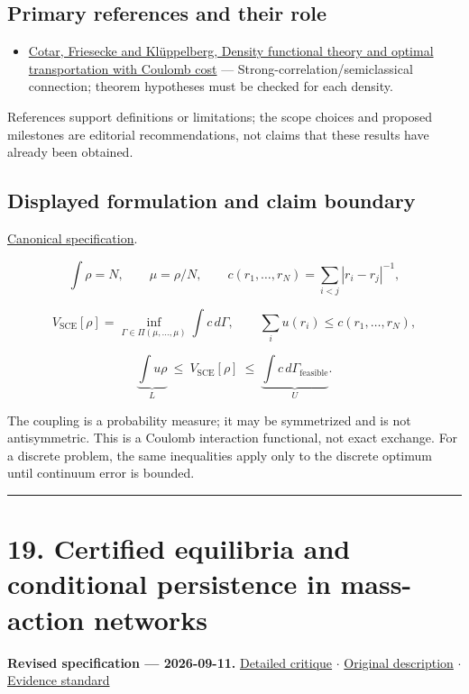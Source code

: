 \documentclass[
  11pt,
]{article}
\providecommand{\tightlist}{%
  \setlength{\itemsep}{0pt}\setlength{\parskip}{0pt}}
\begin{document}
\subsection{Primary references and their role}

\begin{itemize}
\tightlist
\item
  \href{https://arxiv.org/abs/1104.0603}{Cotar, Friesecke and
  Klüppelberg, Density functional theory and optimal transportation with
  Coulomb cost} --- Strong-correlation/semiclassical connection; theorem
  hypotheses must be checked for each density.
\end{itemize}

References support definitions or limitations; the scope choices and
proposed milestones are editorial recommendations, not claims that these
results have already been obtained.

\subsection{Displayed formulation and claim boundary}

\href{https://github.com/rick-stevens-ai/Pure-Thought/blob/main/PRDs/18-Optimal-Transport-Chemistry.md}{Canonical
specification}.

\[\int\rho=N,\qquad \mu=\rho/N,\qquad
c(r_1,\ldots,r_N)=\sum_{i<j}|r_i-r_j|^{-1},\]

\[V_{\mathrm{SCE}}[\rho]=\inf_{\Gamma\in\Pi(\mu,\ldots,\mu)}\int c\,d\Gamma,
\qquad \sum_i u(r_i)\le c(r_1,\ldots,r_N),\]

\[\underbrace{\int u\rho}_{L}\ \le\ V_{\mathrm{SCE}}[\rho]\ \le\
\underbrace{\int c\,d\Gamma_{\mathrm{feasible}}}_{U}.\]

The coupling is a probability measure; it may be symmetrized and is not
antisymmetric. This is a Coulomb interaction functional, not exact
exchange. For a discrete problem, the same inequalities apply only to
the discrete optimum until continuum error is bounded.

\begin{center}\rule{0.5\linewidth}{0.5pt}\end{center}

\section{19. Certified equilibria and conditional persistence in
mass-action networks}

\textbf{Revised specification --- 2026-09-11.}
\href{https://github.com/rick-stevens-ai/Pure-Thought/blob/main/reviews/19-Chemical-Reaction-Networks.md}{Detailed
critique} \ensuremath{\cdot}
\href{https://github.com/rick-stevens-ai/Pure-Thought/blob/main/archive/original-PRDs/19-Chemical-Reaction-Networks.md}{Original
description} \ensuremath{\cdot}
\href{https://github.com/rick-stevens-ai/Pure-Thought/blob/main/reviews/EVIDENCE-STANDARD.md}{Evidence
standard}
\end{document}
